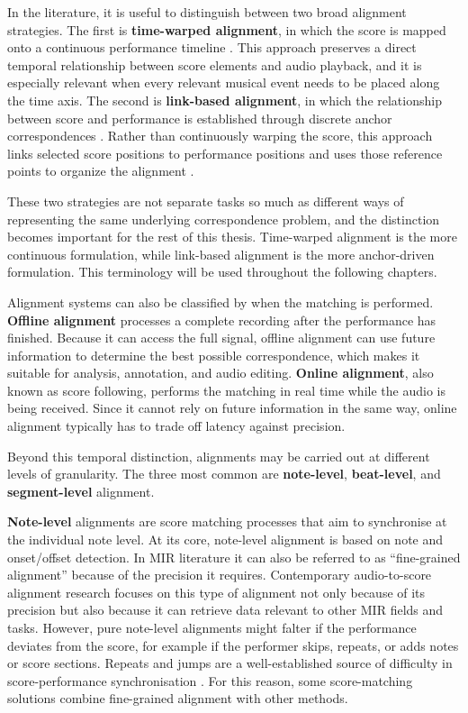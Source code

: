 In the literature, it is useful to distinguish between two broad alignment strategies. The first is \textbf{time-warped alignment}, in which the score is mapped onto a continuous performance timeline \cite{goeblLetsScoreWarpAgain2025a}. This approach preserves a direct temporal relationship between score elements and audio playback, and it is especially relevant when every relevant musical event needs to be placed along the time axis. The second is \textbf{link-based alignment}, in which the relationship between score and performance is established through discrete anchor correspondences \cite{jiangPIANOPRECISIONADVANCING2025}. Rather than continuously warping the score, this approach links selected score positions to performance positions and uses those reference points to organize the alignment \cite{weigl2020MultimodalMusicInformation}.

These two strategies are not separate tasks so much as different ways of representing the same underlying correspondence problem, and the distinction becomes important for the rest of this thesis. Time-warped alignment is the more continuous formulation, while link-based alignment is the more anchor-driven formulation. This terminology will be used throughout the following chapters.

Alignment systems can also be classified by when the matching is performed. \textbf{Offline alignment} processes a complete recording after the performance has finished. Because it can access the full signal, offline alignment can use future information to determine the best possible correspondence, which makes it suitable for analysis, annotation, and audio editing. \textbf{Online alignment}, also known as score following, performs the matching in real time while the audio is being received. Since it cannot rely on future information in the same way, online alignment typically has to trade off latency against precision.

Beyond this temporal distinction, alignments may be carried out at different levels of granularity. The three most common are \textbf{note-level}, \textbf{beat-level}, and \textbf{segment-level} alignment.

\textbf{Note-level} alignments are score matching processes that aim to synchronise at the individual note level. At its core, note-level alignment is based on note and onset/offset detection. In MIR literature it can also be referred to as ``fine-grained alignment'' because of the precision it requires. Contemporary audio-to-score alignment research focuses on this type of alignment not only because of its precision but also because it can retrieve data relevant to other MIR fields and tasks. However, pure note-level alignments might falter if the performance deviates from the score, for example if the performer skips, repeats, or adds notes or score sections. Repeats and jumps are a well-established source of difficulty in score-performance synchronisation \cite{fremereyHandlingRepeats2010}. For this reason, some score-matching solutions combine fine-grained alignment with other methods.

